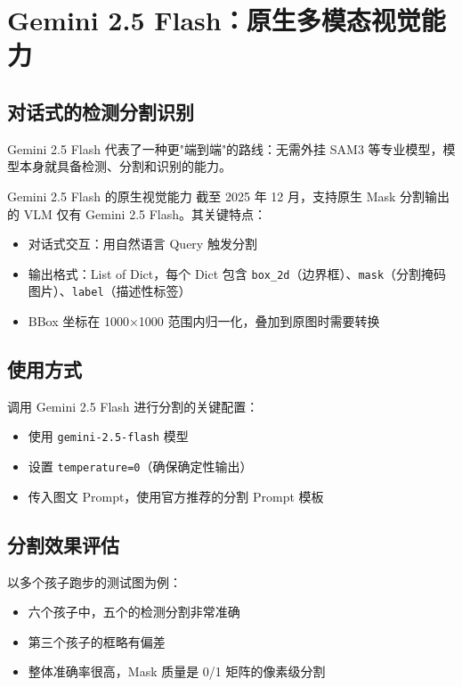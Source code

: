 \section{Gemini 2.5 Flash：原生多模态视觉能力}

\subsection{对话式的检测分割识别}

Gemini 2.5 Flash 代表了一种更"端到端"的路线：无需外挂 SAM3 等专业模型，模型本身就具备检测、分割和识别的能力。

\begin{importantbox}{Gemini 2.5 Flash 的原生视觉能力}
截至 2025 年 12 月，支持原生 Mask 分割输出的 VLM 仅有 Gemini 2.5 Flash。其关键特点：
\begin{itemize}
    \item 对话式交互：用自然语言 Query 触发分割
    \item 输出格式：List of Dict，每个 Dict 包含 \texttt{box\_2d}（边界框）、\texttt{mask}（分割掩码图片）、\texttt{label}（描述性标签）
    \item BBox 坐标在 1000×1000 范围内归一化，叠加到原图时需要转换
\end{itemize}
\end{importantbox}

\subsection{使用方式}

调用 Gemini 2.5 Flash 进行分割的关键配置：

\begin{itemize}
    \item 使用 \texttt{gemini-2.5-flash} 模型
    \item 设置 \texttt{temperature=0}（确保确定性输出）
    \item 传入图文 Prompt，使用官方推荐的分割 Prompt 模板
\end{itemize}

\subsection{分割效果评估}

以多个孩子跑步的测试图为例：
\begin{itemize}
    \item 六个孩子中，五个的检测分割非常准确
    \item 第三个孩子的框略有偏差
    \item 整体准确率很高，Mask 质量是 0/1 矩阵的像素级分割
\end{itemize}


